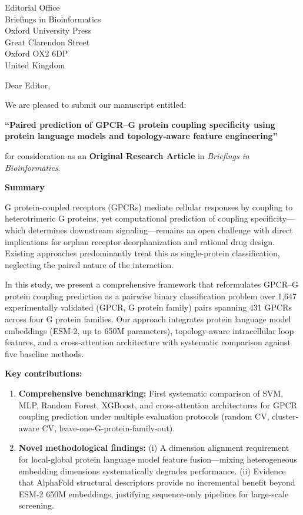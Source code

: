 \documentclass[11pt]{letter}
\begin{document}
\begin{letter}{Editorial Office\\
Briefings in Bioinformatics\\
Oxford University Press\\
Great Clarendon Street\\
Oxford OX2 6DP\\
United Kingdom}

\opening{Dear Editor,}

We are pleased to submit our manuscript entitled:

\textbf{``Paired prediction of GPCR--G protein coupling specificity using protein language models and topology-aware feature engineering''}

for consideration as an \textbf{Original Research Article} in \textit{Briefings in Bioinformatics}.

\textbf{Summary}

G protein-coupled receptors (GPCRs) mediate cellular responses by coupling to heterotrimeric G proteins, yet computational prediction of coupling specificity---which determines downstream signaling---remains an open challenge with direct implications for orphan receptor deorphanization and rational drug design. Existing approaches predominantly treat this as single-protein classification, neglecting the paired nature of the interaction.

In this study, we present a comprehensive framework that reformulates GPCR--G protein coupling prediction as a pairwise binary classification problem over 1,647 experimentally validated (GPCR, G protein family) pairs spanning 431 GPCRs across four G protein families. Our approach integrates protein language model embeddings (ESM-2, up to 650M parameters), topology-aware intracellular loop features, and a cross-attention architecture with systematic comparison against five baseline methods.

\textbf{Key contributions:}

\begin{enumerate}
    \item \textbf{Comprehensive benchmarking:} First systematic comparison of SVM, MLP, Random Forest, XGBoost, and cross-attention architectures for GPCR coupling prediction under multiple evaluation protocols (random CV, cluster-aware CV, leave-one-G-protein-family-out).

    \item \textbf{Novel methodological findings:} (i) A dimension alignment requirement for local-global protein language model feature fusion---mixing heterogeneous embedding dimensions systematically degrades performance. (ii) Evidence that AlphaFold structural descriptors provide no incremental benefit beyond ESM-2 650M embeddings, justifying sequence-only pipelines for large-scale screening.


\end{enumerate}
\end{letter}
\end{document}
